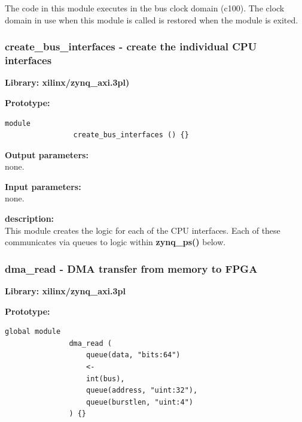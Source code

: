            The code in this module executes in the bus clock domain (c100).
            The clock domain in use when this module is called is restored when
            the module is exited.




        \subsubsection{create\_bus\_interfaces - create the individual CPU interfaces}\label{sec:lmzynqdmabufr}

            {\bf Library: xilinx/zynq\_axi.3pl)}

            {\bf Prototype:} \\
            \vsp
            \begin{lstlisting}[gobble=12, language=threepl]
                module
                create_bus_interfaces () {}
            \end{lstlisting}
            
            {\bf Output parameters:} \\
            
                none.                       
            
            {\bf Input parameters:} \\
            
                none.
                       
            {\bf description:} \\
            This module creates the logic for each of the CPU interfaces. Each
            of these communicates via queues to logic within {\bf zynq\_ps()}
             below.




    
        \subsubsection{dma\_read - DMA transfer from memory to FPGA}\label{sec:lmzynqrddma}

            {\bf Library: xilinx/zynq\_axi.3pl}


            {\bf Prototype:} \\
            \vsp
            \begin{lstlisting}[gobble=12, language=threepl]
               global module
               dma_read (
                   queue(data, "bits:64")
                   <-
                   int(bus),
                   queue(address, "uint:32"),
                   queue(burstlen, "uint:4")
               ) {}
            \end{lstlisting}

